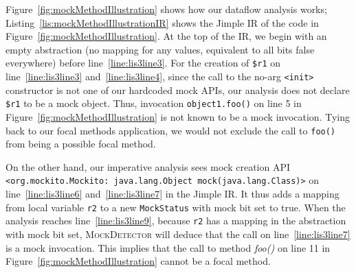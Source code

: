 Figure~\ref{fig:mockMethodIllustration} shows how our dataflow analysis works; Listing~\ref{lis:mockMethodIllustrationIR} shows the Jimple IR of the code in Figure~\ref{fig:mockMethodIllustration}. At the top of the IR, we begin with an empty abstraction (no mapping for any values, equivalent to all bits false everywhere) before line~\ref{line:lis3line3}. For the creation of \texttt{\$r1} on line~\ref{line:lis3line3} and~\ref{line:lis3line4}, since the call to the no-arg \texttt{<init>} constructor is not one of our hardcoded mock APIs, our analysis does not declare \texttt{\$r1} to be a mock object. 
Thus, invocation \texttt{object1.foo()} on line 5 in Figure~\ref{fig:mockMethodIllustration} is not known to be a mock invocation. Tying back to our focal methods application, we would not exclude the call to \texttt{foo()} from being a possible focal method.

On the other hand, our imperative analysis sees mock creation API \texttt{<org.mockito.Mockito: java.lang.Object mock(java.lang.Class)>} on line~\ref{line:lis3line6} and~\ref{line:lis3line7} in the Jimple IR. It thus adds a mapping from local variable \texttt{r2} to a new \texttt{MockStatus} with mock bit set to true. When the analysis reaches line~\ref{line:lis3line9}, because \texttt{r2} has a mapping in the abstraction with mock bit set, \textsc{MockDetector} will deduce that the call on line~\ref{line:lis3line7} is a mock invocation. This implies that the call to method \textit{foo()} on line 11 in Figure~\ref{fig:mockMethodIllustration} cannot be a focal method.


